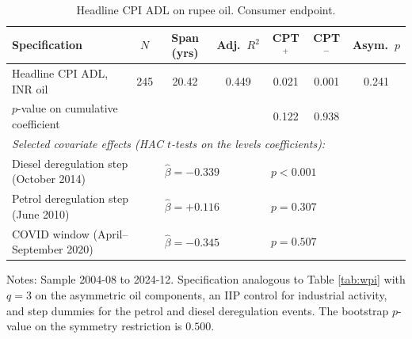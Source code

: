 \begin{table}[t]
\centering
\caption{Headline CPI ADL on rupee oil. Consumer endpoint.}
\label{tab:cpi}
\footnotesize
\setlength{\tabcolsep}{5pt}
\begin{threeparttable}
\begin{tabular}{l c c c c c c}
\toprule
Specification & $N$ & Span (yrs) & Adj.\ $R^2$ & CPT$^+$ & CPT$^-$ & Asym.\ $p$ \\
\midrule
Headline CPI ADL, INR oil & 245 & 20.42 & 0.449 & 0.021 & 0.001 & 0.241 \\
$p$-value on cumulative coefficient & & & & 0.122 & 0.938 & \\
\midrule
\multicolumn{7}{l}{\emph{Selected covariate effects (HAC $t$-tests on the levels coefficients):}} \\
\multicolumn{2}{l}{Diesel deregulation step (October 2014)} & \multicolumn{2}{l}{$\hat\beta = -0.339$} & \multicolumn{2}{l}{$p < 0.001$} & \\
\multicolumn{2}{l}{Petrol deregulation step (June 2010)} & \multicolumn{2}{l}{$\hat\beta = +0.116$} & \multicolumn{2}{l}{$p = 0.307$} & \\
\multicolumn{2}{l}{COVID window (April--September 2020)} & \multicolumn{2}{l}{$\hat\beta = -0.345$} & \multicolumn{2}{l}{$p = 0.507$} & \\
\bottomrule
\end{tabular}
\begin{tablenotes}\footnotesize
\item Notes: Sample 2004-08 to 2024-12. Specification analogous to Table \ref{tab:wpi} with $q = 3$ on the asymmetric oil components, an IIP control for industrial activity, and step dummies for the petrol and diesel deregulation events. The bootstrap $p$-value on the symmetry restriction is $0.500$.
\end{tablenotes}
\end{threeparttable}
\end{table}
